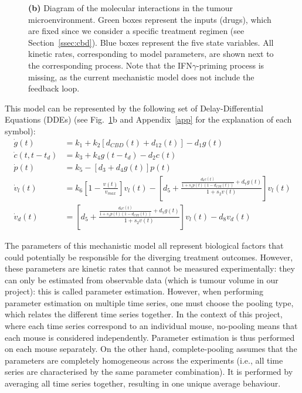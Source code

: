 \documentclass[11pt]{article}
\begin{document}
\begin{figure}[!ht]
{    \textbf{(b)} Diagram of the molecular interactions in the tumour microenvironment. Green boxes represent the inputs (drugs), which are fixed since we consider a specific treatment regimen (see Section~\ref{ssec:cbd}). Blue boxes represent the five state variables. All kinetic rates, corresponding to model parameters, are shown next to the corresponding process. Note that the IFN$\gamma$-priming process is missing, as the current mechanistic model does not include the feedback loop.}
    \label{fig:mech}
\end{figure}

This model can be represented by the following set of Delay-Differential Equations (DDEs) \cite{takuya} (see Fig.~\ref{fig:mech}b and Appendix~\ref{app} for the explanation of each symbol): 
\begin{align*}
    \dot{g}(t) &= k_1 + k_2 [d_{CBD}(t) + d_{12}(t)] - d_1g(t) \\ 
    \dot{c}(t,t-t_d) &= k_3 + k_4g(t-t_d)-d_2c(t) \\ 
    \dot{p}(t) &= k_5 - [d_3 + d_4g(t)]p(t) \\ 
    \dot{v}_l(t) &= k_6\left[1 - \frac{v(t)}{v_{max}} \right]v_l(t) - \left[d_5 + \frac{\frac{d_6c(t)}{1+s_1p(t)(1-d_{CPI}(t))}+d_7g(t)}{1+s_2v(t)}\right]v_l(t)\\
    \dot{v}_d(t) &= \left[d_5 + \frac{\frac{d_6c(t)}{1+s_1p(t)(1-d_{CPI}(t))}+d_7g(t)}{1+s_2v(t)}\right]v_l(t) - d_8 v_d(t)
\end{align*}

The parameters of this mechanistic model all represent biological factors that could potentially be responsible for the diverging treatment outcomes. However, these parameters are kinetic rates that cannot be measured experimentally: they can only be estimated from observable data (which is tumour volume in our project): this is called parameter estimation. However, when performing parameter estimation on multiple time series, one must choose the pooling type, which relates the different time series together. In the context of this project, where each time series correspond to an individual mouse, no-pooling means that each mouse is considered independently. Parameter estimation is thus performed on each mouse separately. On the other hand, complete-pooling assumes that the parameters are completely homogeneous across the experiments (i.e., all time series are characterised by the same parameter combination). It is performed by averaging all time series together, resulting in one unique average behaviour. 
\end{document}
